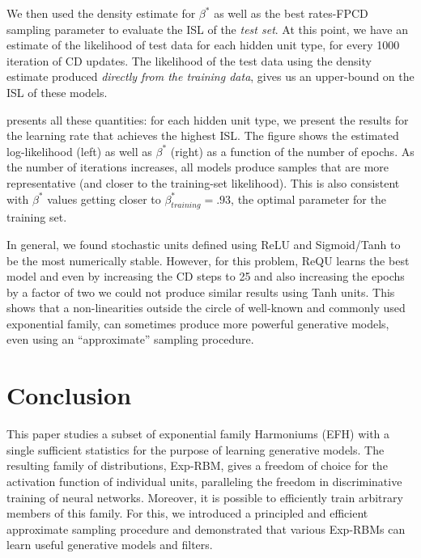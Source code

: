 \documentclass[twoside]{article}
\theoremstyle{plain}
\theoremstyle{definition}
\theoremstyle{remark}
\begin{document}
We then used the density estimate for $\beta^*$ as well as the best rates-FPCD sampling parameter to evaluate the ISL of the \textit{test set}.
At this point, we have an estimate of the likelihood of test data for each hidden unit type, for every 1000 iteration of CD updates. 
The likelihood of the test data using the density estimate produced \textit{directly from the training data}, gives us an upper-bound on the ISL of these models.

 presents all these quantities: for each hidden unit type, we present the results for the learning rate that achieves the highest ISL. 
The figure shows the estimated log-likelihood  (left) as well as $\beta^*$ (right) as a function of the number of epochs. 
As the number of iterations increases, all models produce samples
that are more representative (and closer to the training-set likelihood). This is also consistent with $\beta^*$ values getting closer to $\beta^*_{training} = .93$, the optimal parameter for the training set.

In general, we found stochastic units defined using ReLU and Sigmoid/Tanh to be the most numerically stable. However, for this problem, ReQU learns the best model and even by increasing the CD steps to 25 and also increasing the epochs by a factor of two we could not produce
similar results using Tanh units.  
This shows that a non-linearities outside the circle of well-known and commonly used exponential family, can sometimes produce more powerful generative models, even using an ``approximate'' sampling procedure.


\section*{Conclusion}
This paper studies a subset of exponential family Harmoniums (EFH) with a single sufficient statistics for the purpose of learning generative models. 
The resulting family of distributions, Exp-RBM, gives a freedom of choice for the activation function of individual units, paralleling the freedom in discriminative training of neural networks. 
Moreover, it is possible to efficiently train arbitrary members of this family.
For this, we introduced a principled and efficient approximate sampling procedure and demonstrated 
that various Exp-RBMs can learn useful generative models and filters.


  
\clearpage
\appendix
\end{document}
